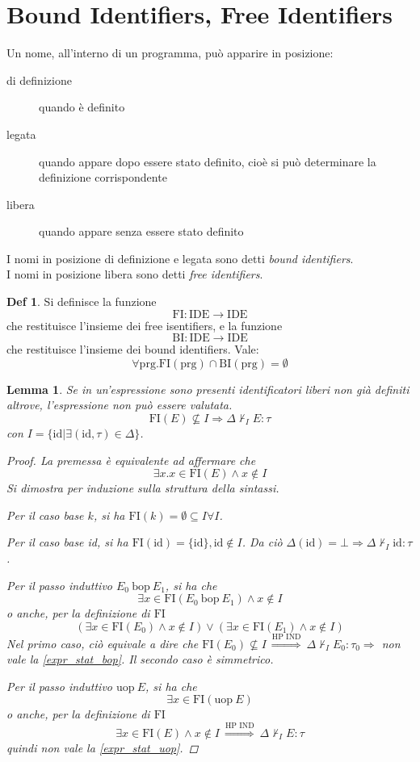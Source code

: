 \documentclass[a4paper]{report}
\newcommand{\bop}{\ \mathrm{bop}\ }
\newcommand{\uop}{\mathrm{uop}\ }
\newcommand{\FI}{\mathrm{FI}}
\newcommand{\BI}{\mathrm{BI}}
\newcommand{\IDE}{\mathrm{IDE}}
\newcommand{\perhpind}{\ \stackrel{\text{HP IND}}{\Longrightarrow}\ }
\theoremstyle{definition} \newtheorem*{defi}{Def}
\theoremstyle{plain} \newtheorem{lemma}{Lemma}
\theoremstyle{plain} \newtheorem{teo}{Teorema}
\theoremstyle{remark} \newtheorem*{es}{Esempio}
\begin{document}
\section{Bound Identifiers, Free Identifiers}
Un nome, all'interno di un programma, può apparire in posizione:
\begin{description}
  \item[di definizione] quando è definito
  \item[legata] quando appare dopo essere stato definito, cioè si può
    determinare la definizione corrispondente
  \item[libera] quando appare senza essere stato definito
\end{description}
I nomi in posizione di definizione e legata sono detti {\em bound identifiers}.
\\ I nomi in posizione libera sono detti {\em free identifiers}.
\begin{defi}
  Si definisce la funzione
  \[\FI: \IDE \rightarrow \IDE\]
  che restituisce l'insieme dei free isentifiers, e la funzione
  \[\BI: \IDE \rightarrow \IDE\]
  che restituisce l'insieme dei bound identifiers. Vale:
  \[\forall \mathrm{prg}.\FI(\mathrm{prg})\cap \BI(\mathrm{prg})=\emptyset\]
\end{defi}
\begin{lemma}
  Se in un'espressione sono presenti identificatori liberi non già definiti
  altrove, l'espressione non può essere valutata.
  \[\FI(E)\not\subseteq I \Rightarrow \Delta\not\vdash_I E:\tau\]
  con $I=\{\mathrm{id}|\exists(\mathrm{id},\tau)\in\Delta\}$.
  \begin{proof}
    La premessa è equivalente ad affermare che
    \[\exists x . x \in \FI(E) \wedge x \not\in I\]
    Si dimostra per induzione sulla struttura della sintassi.

    Per il caso base $k$, si ha $\FI(k)=\emptyset \subseteq I \forall I$.

    Per il caso base id, si ha $\FI(\mathrm{id}) = \{\mathrm{id}\},
      \mathrm{id} \not\in I$.
    Da ciò $\Delta(\mathrm{id}) = \bot \Rightarrow \Delta \not\vdash_I \mathrm{id}:\tau$.

    Per il passo induttivo $E_0 \bop E_1$, si ha che 
    \[\exists x \in \FI(E_0 \bop E_1) \wedge x \not\in I\]
    o anche, per la definizione di $\FI$
    \[(\exists x \in \FI(E_0) \wedge x \not\in I) \vee (\exists x \in \FI(E_1) \wedge x \not\in I)\]
    Nel primo caso, ciò equivale a dire che $\FI(E_0) \not\subseteq I
    \perhpind
    \Delta \not\vdash_I E_0 : \tau_0 \Rightarrow $ non vale la \ref{expr_stat_bop}.
    Il secondo caso è simmetrico.

    Per il passo induttivo $\uop E$, si ha che
    \[\exists x \in \FI(\uop E)\]
    o anche, per la definizione di $\FI$
    \[\exists x \in \FI(E) \wedge x \not\in I
      \perhpind
    \Delta \not\vdash_I E : \tau\]
    quindi non vale la \ref{expr_stat_uop}.
  \end{proof}
\end{lemma}
\end{document}
